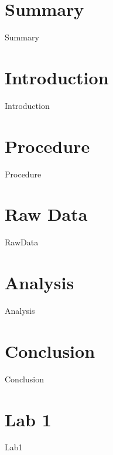 \documentclass[12pt,a4paper]{article}
\begin{document}
    \tableofcontents
    \section{Summary}
        {Summary}
    \section{Introduction}
        {Introduction}
    \section{Procedure}
        {Procedure}
    \section{Raw Data}
	    {RawData}
    \section{Analysis}
		{Analysis}
    \section{Conclusion}
	    {Conclusion}
    \section{Lab 1}
        {Lab1}
\end{document}
